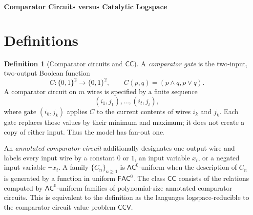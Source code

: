 \documentclass[10pt,a4paper]{article}
\theoremstyle{definition}
\newtheorem*{definition*}{Definition}
\newcommand{\CC}{\mathsf{CC}}
\newcommand{\AC}{\mathsf{AC}}
\begin{document}
\begin{center}
  {\Large\bfseries Comparator Circuits versus Catalytic Logspace}
\end{center}

\section{Definitions}

\begin{definition*}[Comparator circuits and $\CC$]
A \emph{comparator gate} is the two-input, two-output Boolean function
\begin{equation}
  C:\{0,1\}^{2}\longrightarrow\{0,1\}^{2},
  \qquad
  C(p,q)=(p\wedge q,p\vee q).
\end{equation}
A comparator circuit on $m$ wires is specified by a finite sequence
\begin{equation}
  (i_1,j_1),\ldots,(i_t,j_t),
\end{equation}
where gate $(i_k,j_k)$ applies $C$ to the current contents of wires $i_k$ and
$j_k$. Each gate replaces those values by their minimum and maximum; it does
not create a copy of either input. Thus the model has fan-out one.

An \emph{annotated comparator circuit} additionally designates one output wire
and labels every input wire by a constant $0$ or $1$, an input variable $x_i$,
or a negated input variable $\neg x_i$. A family $\{C_n\}_{n\geq1}$ is
$\AC^0$-uniform when the description of $C_n$ is generated by a function in
uniform $\mathsf{FAC}^0$. The class $\CC$ consists of the relations computed by
$\AC^0$-uniform families of polynomial-size annotated comparator circuits.
This is equivalent to the definition as the languages logspace-reducible to
the comparator circuit value problem $\mathsf{CCV}$.
\end{definition*}
\end{document}
